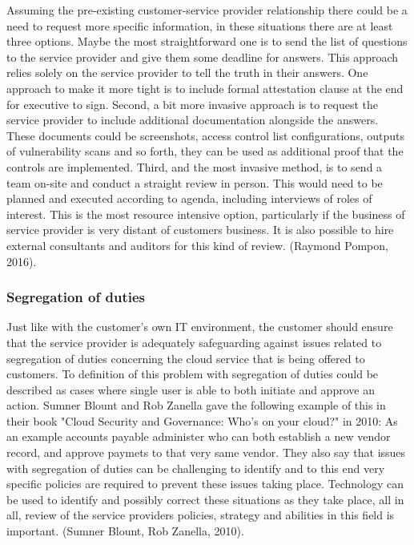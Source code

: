 \documentclass{article}
\begin{document}
Assuming the pre-existing customer-service provider relationship there could be a need to request more specific information, in these situations there are at least three options. Maybe the most straightforward one is to send the list of questions to the service provider and give them some deadline for answers. This approach relies solely on the service provider to tell the truth in their answers. One approach to make it more tight is to include formal attestation clause at the end for executive to sign. Second, a bit more invasive approach is to request the service provider to include additional documentation alongside the answers. These documents could be screenshots, access control list configurations, outputs of vulnerability scans and so forth, they can be used as additional proof that the controls are implemented. Third, and the most invasive method, is to send a team on-site and conduct a straight review in person. This would need to be planned and executed according to agenda, including interviews of roles of interest. This is the most resource intensive option, particularly if the business of service provider is very distant of customers business. It is also possible to hire external consultants and auditors for this kind of review. (Raymond Pompon, 2016). 
\subsubsection{Segregation of duties}
Just like with the customer's own IT environment, the customer should ensure that the service provider is adequately safeguarding against issues related to segregation of duties concerning the cloud service that is being offered to customers.
To definition of this problem with segregation of duties could be described as cases where single user is able to both initiate and approve an action. Sumner Blount and Rob Zanella gave the following example of this in their book "Cloud Security and Governance: Who's on your cloud?" in 2010: As an example accounts payable administer who can both establish a new vendor record, and approve paymets to that very same vendor. They also say that issues with segregation of duties can be challenging to identify and to this end very specific policies are required to prevent these issues taking place. Technology can be used to identify and possibly correct these situations as they take place, all in all, review of the service providers policies, strategy and abilities in this field is important. (Sumner Blount, Rob Zanella, 2010). 
\end{document}
